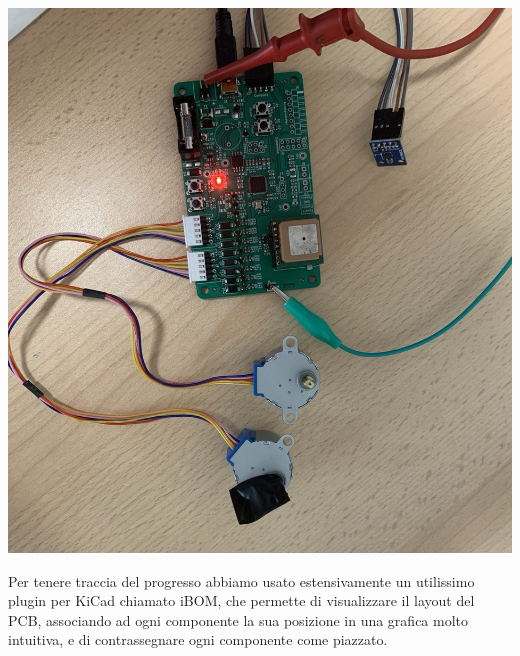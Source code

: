 \begin{center}
\includegraphics[scale=0.4]{figures/image101.png}
\captionsetup{type=figure}
\end{center}

Per tenere traccia del progresso abbiamo usato estensivamente un 
utilissimo plugin per KiCad chiamato iBOM, che permette di visualizzare il 
layout del PCB, associando ad ogni componente la sua posizione in una grafica molto 
intuitiva, e di contrassegnare ogni componente come piazzato.

